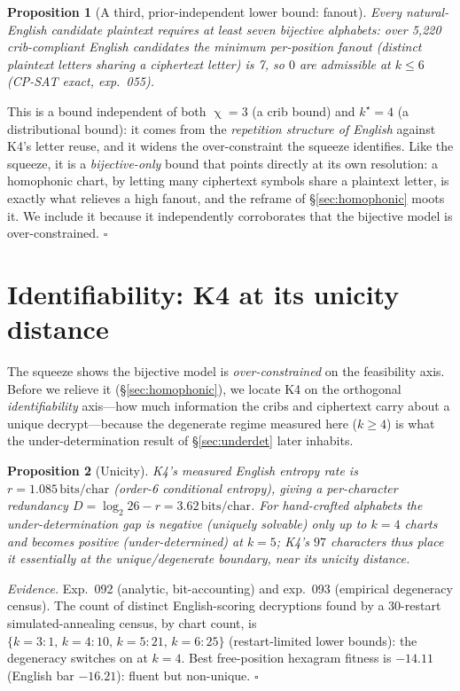 \documentclass[11pt]{article}
\theoremstyle{plain}
\newtheorem{proposition}{Proposition}
\theoremstyle{definition}
\newcommand{\K}{\textsf{K4}}
\newcommand{\bits}{\,\text{bits/char}}
\DeclareMathOperator{\chrom}{\chi}
\begin{document}
\begin{proposition}[A third, prior-independent lower bound: fanout]\label{prop:fanout}
Every natural-English candidate plaintext requires at least \emph{seven} bijective
alphabets: over 5{,}220 crib-compliant English candidates the minimum per-position
\emph{fanout} (distinct plaintext letters sharing a ciphertext letter) is 7, so $0$
are admissible at $k\le6$ (CP-SAT exact, exp.~055).
\end{proposition}
\noindent
This is a bound independent of both $\chrom=3$ (a crib bound) and $k^\star=4$ (a
distributional bound): it comes from the \emph{repetition structure of English}
against \K{}'s letter reuse, and it widens the over-constraint the squeeze
identifies. Like the squeeze, it is a \emph{bijective-only} bound that points directly
at its own resolution: a homophonic chart, by letting many ciphertext symbols share a
plaintext letter, is exactly what relieves a high fanout, and the reframe of
\S\ref{sec:homophonic} moots it. We include it because it independently corroborates
that the bijective model is over-constrained. \hfill$\square$

\section{Identifiability: K4 at its unicity distance}\label{sec:unicity}

The squeeze shows the bijective model is \emph{over-constrained} on the feasibility
axis. Before we relieve it (\S\ref{sec:homophonic}), we locate \K{} on the orthogonal
\emph{identifiability} axis---how much information the cribs and ciphertext carry
about a unique decrypt---because the degenerate regime measured here ($k\ge4$) is what
the under-determination result of \S\ref{sec:underdet} later inhabits.

\begin{proposition}[Unicity]\label{prop:unicity}
\K{}'s measured English entropy rate is $r=1.085\bits$ (order-6 conditional entropy),
giving a per-character redundancy $D=\log_2 26 - r = 3.62\bits$. For hand-crafted
alphabets the under-determination gap is negative (uniquely solvable) only up to
$k=4$ charts and becomes positive (under-determined) at $k=5$; \K{}'s $97$ characters
thus place it essentially \emph{at} the unique/degenerate boundary, near its unicity
distance.
\end{proposition}

\noindent\emph{Evidence.} Exp.~092 (analytic, bit-accounting) and exp.~093
(empirical degeneracy census). The count of distinct English-scoring decryptions
found by a 30-restart simulated-annealing census, by chart count, is
$\{k{=}3{:}1,\,k{=}4{:}10,\,k{=}5{:}21,\,k{=}6{:}25\}$ (restart-limited lower bounds):
the degeneracy switches on at $k=4$. Best free-position hexagram fitness is $-14.11$
(English bar $-16.21$): fluent but non-unique. \hfill$\square$
\end{document}
